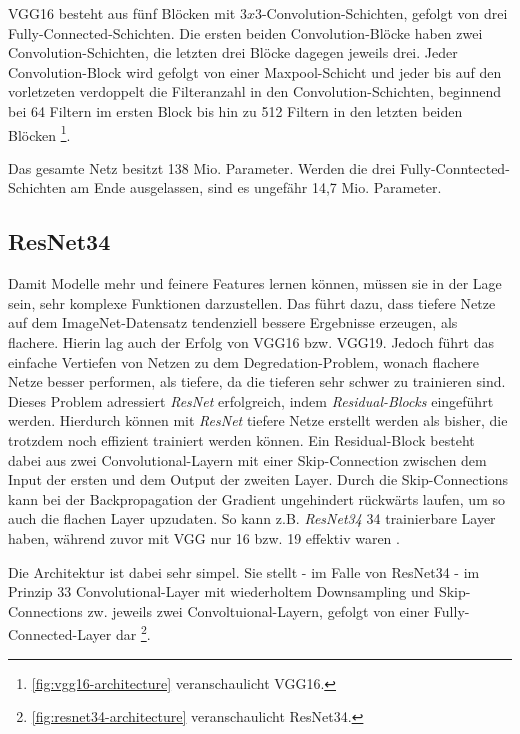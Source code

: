 VGG16 besteht aus fünf Blöcken mit $3x3$-Convolution-Schichten,
gefolgt von drei Fully-Connected-Schichten. Die ersten beiden Convolution-Blöcke haben zwei Convolution-Schichten,
die letzten drei Blöcke dagegen jeweils drei. 
Jeder Convolution-Block wird gefolgt von einer Maxpool-Schicht und jeder bis auf den vorletzeten verdoppelt die Filteranzahl in den Convolution-Schichten,
beginnend bei 64 Filtern im ersten Block bis hin zu 512 Filtern in den letzten beiden Blöcken \cite{Simonyan.04092014}\footnote{\autoref{fig:vgg16-architecture} veranschaulicht VGG16.}. 

Das gesamte Netz besitzt 138 Mio. Parameter. Werden die drei Fully-Conntected-Schichten am Ende ausgelassen, 
sind es ungefähr 14,7 Mio. Parameter. 

\subsection{ResNet34} \label{sec:pretrained-backbones:resnet}

Damit Modelle mehr und feinere Features lernen können, müssen sie in der Lage sein, sehr komplexe Funktionen darzustellen. 
Das führt dazu, dass tiefere Netze auf dem ImageNet-Datensatz tendenziell bessere Ergebnisse erzeugen, als flachere. 
Hierin lag auch der Erfolg von VGG16 bzw. VGG19. Jedoch führt das einfache Vertiefen von Netzen zu dem Degredation-Problem, wonach 
flachere Netze besser performen, als tiefere, da die tieferen sehr schwer zu trainieren sind. \\
Dieses Problem adressiert \textit{ResNet} erfolgreich, indem \textit{Residual-Blocks} eingeführt werden. 
Hierdurch können mit \textit{ResNet} tiefere Netze erstellt werden als bisher, die trotzdem noch effizient trainiert werden können.
Ein Residual-Block besteht dabei aus zwei Convolutional-Layern mit einer Skip-Connection zwischen dem Input der ersten und dem Output 
der zweiten Layer. Durch die Skip-Connections kann bei der Backpropagation der Gradient ungehindert rückwärts laufen, 
um so auch die flachen Layer upzudaten. So kann z.B. \textit{ResNet34} 34 trainierbare Layer haben, 
während zuvor mit VGG nur 16 bzw. 19 effektiv waren \cite{He.10122015}. 

Die Architektur ist dabei sehr simpel. Sie stellt - im Falle von ResNet34 - im Prinzip 33 Convolutional-Layer mit wiederholtem Downsampling 
und Skip-Connections zw. jeweils zwei Convoltuional-Layern, gefolgt von einer Fully-Connected-Layer dar \cite{He.10122015}\footnote{\autoref{fig:resnet34-architecture} veranschaulicht ResNet34.}.


